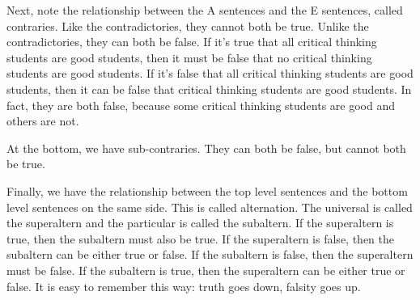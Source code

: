 Next, note the relationship between the A sentences and the E sentences, called contraries. Like the contradictories, they cannot both be true. Unlike the contradictories, they can both be false. If it's true that all critical thinking students are good students, then it must be false that no critical thinking students are good students. If it's false that all critical thinking students are good students, then it can be false that critical thinking students are good students. In fact, they are both false, because some critical thinking students are good and others are not. 

\medskip
{}

At the bottom, we have sub-contraries. They can both be false, but cannot both be true.

\medskip
{}

Finally, we have the relationship between the top level sentences and the bottom level sentences on the same side. This is called alternation. The universal is called the superaltern and the particular is called the subaltern. If the superaltern is true, then the subaltern must also be true. If the superaltern is false, then the subaltern can be either true or false. If the subaltern is false, then the superaltern must be false. If the subaltern is true, then the superaltern can be either true or false. It is easy to remember this way: truth goes down, falsity goes up.

